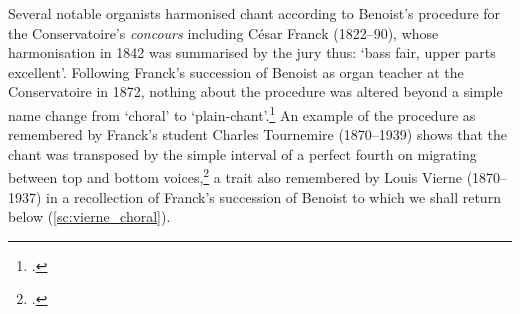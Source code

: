 Several notable organists harmonised chant according to Benoist's procedure for the Conservatoire's \emph{concours} including César Franck (1822--90), whose harmonisation in 1842 was summarised by the jury thus: `bass fair, upper parts excellent'.
Following Franck's succession of Benoist as organ teacher at the Conservatoire in 1872, nothing about the procedure was altered beyond a simple name change from `choral' to `plain-chant'.\footcite[The chant that Franck harmonised has been preserved at the \emph{Archives nationales} and is reproduced in][pp.~149--50, p.~257 nn.~7--8]{OchseOrganistsOrganPlaying2000}
An example of the procedure as remembered by Franck's student Charles Tournemire (1870--1939) shows that the chant was transposed by the simple interval of a perfect fourth on migrating between top and bottom voices,\footnote{\covid{}\cite[105]{TournemirePrecisexecutionregistration1936}.} a trait also remembered by Louis Vierne (1870--1937) in a recollection of Franck's succession of Benoist to which we shall return below (\cref{sc:vierne_choral}).

